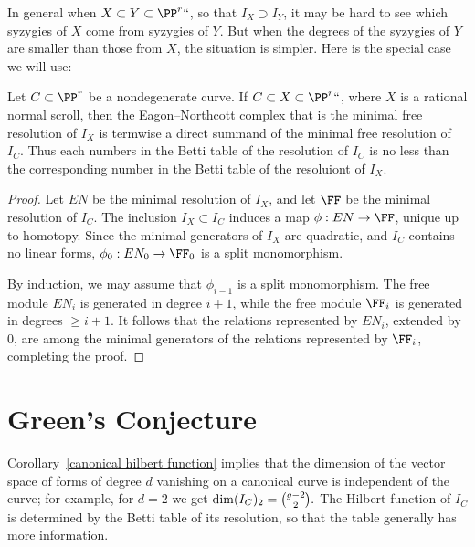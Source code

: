 In general when $X\subset Y\subset \PP^r` `$, so that $I_X \supset I_Y$,
it may be hard to see which syzygies of $X$ come
from syzygies of $Y$. But when the degrees of the syzygies of $Y$ are
smaller than those from $X$, the situation is simpler.
Here is the special case we will use:

\begin{proposition}
Let $C\subset \PP^r$ be
a nondegenerate curve. If $C\subset X
\subset \PP^r` `$, where $X$ is a rational
%
normal scroll, then the Eagon--Northcott complex that is  the minimal
free resolution of $I_X$ is termwise a direct summand
of the minimal free resolution of $I_C$. Thus each numbers in the Betti table of the
%
resolution of $I_C$ is  
no less than
the corresponding number in the Betti table of the resoluiont of $I_X$.
\unif
\end{proposition}

\begin{proof}
Let $EN$ be the minimal resolution of $I_X$, and let $\FF$ be the minimal
resolution of $I_C$.
The inclusion $I_X \subset I_C$ induces a map $\phi: EN\to \FF$, unique
up to homotopy. Since the minimal generators of $I_X$ are quadratic,
and $I_C$ contains no linear forms, $\phi_0: EN_0\to \FF_0$ is a split
monomorphism.

By induction, we may assume that $\phi_{i-1}$ is a split monomorphism. The
free module $EN_{i}$ is generated in
degree $i+1$, while the free module $\FF_i$ is generated in degrees
$\geq i+1$. It follows that the relations
represented by $EN_i$, extended by 0, are among the minimal generators
of the relations represented by $\FF_i$,
completing the proof.
\end{proof}

\section{Green's Conjecture}

Corollary~\ref{canonical hilbert function} implies that the dimension
%
of the vector space of forms of degree $d$
vanishing on a canonical curve is independent of the curve; for example,
for $d=2$ we get
$
\dim ({I_{C}})_{2} = \tbinom{g-2}{2}.
$
The Hilbert function of $I_C$ is determined by the Betti table of its
%
resolution, so that the table generally has more information.

